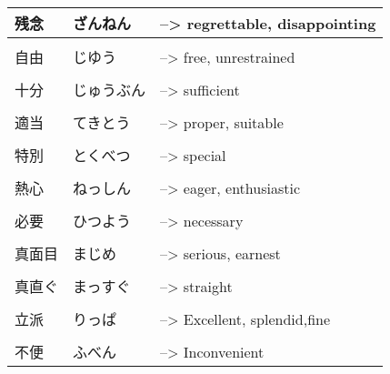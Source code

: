 \documentclass{article}
\begin{document}
\begin{tabular}{ l | l l }
残念&ざんねん&--> regrettable, disappointing\\ \hline\\[-1em]
自由&じゆう&--> free, unrestrained\\ \hline\\[-1em]
十分&じゅうぶん&--> sufficient\\ \hline\\[-1em]
適当 	&てきとう&--> proper, suitable\\ \hline\\[-1em]
特別 	&とくべつ &--> special\\ \hline\\[-1em]
熱心 	&ねっしん &--> eager, enthusiastic\\ \hline\\[-1em]
必要 	&ひつよう &--> necessary\\ \hline\\[-1em]
真面目 	&まじめ &--> serious, earnest\\ \hline\\[-1em]
真直ぐ 	&まっすぐ&--> straight\\ \hline\\[-1em]
立派 	&りっぱ &--> Excellent, splendid,fine\\ \hline\\[-1em]
不便 	&ふべん &--> Inconvenient   %
\end{tabular}
\end{document}
